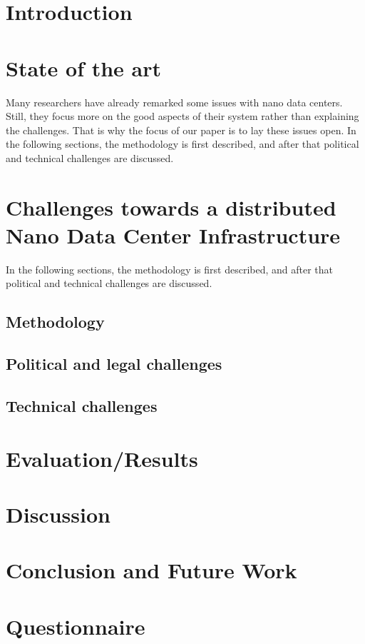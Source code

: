 
\section{Introduction}


\section{State of the art}
\label{StateOfTheArt}
Many researchers have already remarked some issues with nano data centers. Still, they focus more on the good aspects of their system rather than explaining the challenges. That is why the focus of our paper is to lay these issues open. In the following sections, the methodology is first described, and after that political and technical challenges are discussed. 




\section{Challenges towards a distributed Nano Data Center Infrastructure}
\label{sec:challenges}
In the following sections, the methodology is first described, and after that political and technical challenges are discussed. 

\subsection{Methodology}



\subsection{Political and legal challenges}


\subsection{Technical challenges}


\section{Evaluation/Results}


\section{Discussion}



\section{Conclusion and Future Work}






\appendix
\section{Questionnaire}


